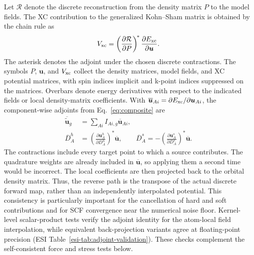 \documentclass[10pt,a4paper,twocolumn]{article}
\newcommand{\uvec}{\boldsymbol{u}}
\begin{document}
Let $\mathcal R$ denote the discrete reconstruction from the density matrix $P$ to the model fields. The XC contribution to the generalized Kohn--Sham matrix is obtained by the chain rule as
\begin{equation}
 V_{\rm xc}=\left(\frac{\partial\mathcal R}{\partial P}\right)^{\!*}
             \frac{\partial E_{\rm xc}}{\partial\uvec}.
 \label{eq:adjoint}
\end{equation}
The asterisk denotes the adjoint under the chosen discrete contractions. The symbols $P$, $\uvec$, and $V_{\rm xc}$ collect the density matrices, model fields, and XC potential matrices, with spin indices implicit and k-point indices suppressed on the matrices. Overbars denote energy derivatives with respect to the indicated fields or local density-matrix coefficients. With $\overline{\uvec}_{Ai}=\partial E_{\rm xc}/\partial\uvec_{Ai}$, the component-wise adjoints from Eq.~\eqref{eq:composite} are
\begin{align}
 \overline{\widetilde{\uvec}}_g&=\sum_{Ai}I_{Ai,g}\overline{\uvec}_{Ai},\nonumber\\
 \overline D^h_A&=\left(\frac{\partial\uvec^h_A}{\partial D^h_A}\right)^{\!*}
                       \overline{\uvec},\qquad
 \overline D^s_A=-\left(\frac{\partial\uvec^s_A}{\partial D^s_A}\right)^{\!*}
                       \overline{\uvec}.
 \label{eq:component-adjoints}
\end{align}
The contractions include every target point to which a source contributes. The quadrature weights are already included in $\overline{\uvec}$, so applying them a second time would be incorrect. The local coefficients are then projected back to the orbital density matrix. Thus, the reverse path is the transpose of the actual discrete forward map, rather than an independently interpolated potential. This consistency is particularly important for the cancellation of hard and soft contributions and for SCF convergence near the numerical noise floor.
Kernel-level scalar-product tests verify the adjoint identity for the atom-local field interpolation, while equivalent back-projection variants agree at floating-point precision (ESI Table~\ref{esi-tab:adjoint-validation}). These checks complement the self-consistent force and stress tests below.
\end{document}
